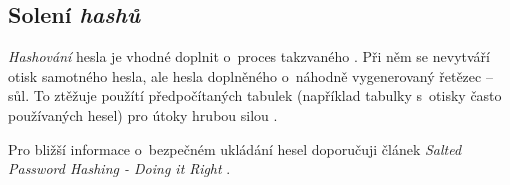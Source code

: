 \subsection{Solení \textit{hashů}}

\textit{Hashování} hesla je vhodné doplnit o~proces takzvaného . Při něm se nevytváří otisk samotného hesla, ale hesla doplněného o~náhodně vygenerovaný řetězec -- sůl. To ztěžuje použítí předpočítaných tabulek (například tabulky s~otisky často používaných hesel) pro útoky hrubou silou \cite{hash_crackstation}.

Pro bližší informace o~bezpečném ukládání hesel doporučuji článek \textit{Salted Password Hashing - Doing it Right} \cite{hash_crackstation}.
